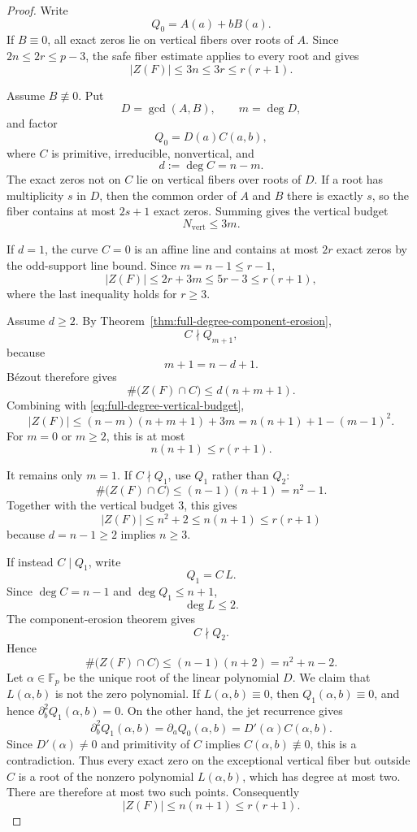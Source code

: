 \documentclass[11pt]{article}
\newcommand{\F}{\mathbb F}
\begin{document}
\begin{proof}
Write
\[
 Q_0=A(a)+bB(a).
\]
If \(B\equiv0\), all exact zeros lie on vertical fibers over roots of
\(A\).  Since \(2n\le2r\le p-3\), the safe fiber estimate applies to
every root and gives
\[
 |Z(F)|\le3n\le3r\le r(r+1).
\]

Assume \(B\not\equiv0\).  Put
\[
 D=\gcd(A,B),\qquad m=\deg D,
\]
and factor
\[
 Q_0=D(a)C(a,b),
\]
where \(C\) is primitive, irreducible, nonvertical, and
\[
 d:=\deg C=n-m.
\]
The exact zeros not on \(C\) lie on vertical fibers over roots of
\(D\).  If a root has multiplicity \(s\) in \(D\), then the common
order of \(A\) and \(B\) there is exactly \(s\), so the fiber contains
at most \(2s+1\) exact zeros.  Summing gives the vertical budget
\begin{equation}
 N_{\mathrm{vert}}\le3m.
 \label{eq:full-degree-vertical-budget}
\end{equation}

If \(d=1\), the curve \(C=0\) is an affine line and contains at most
\(2r\) exact zeros by the odd-support line bound.  Since
\(m=n-1\le r-1\),
\[
 |Z(F)|
 \le2r+3m
 \le5r-3
 \le r(r+1),
\]
where the last inequality holds for \(r\ge3\).

Assume \(d\ge2\).  By
Theorem~\ref{thm:full-degree-component-erosion},
\[
 C\nmid Q_{m+1},
\]
because
\[
 m+1=n-d+1.
\]
B\'ezout therefore gives
\[
 \#\bigl(Z(F)\cap C\bigr)
 \le
 d(n+m+1).
\]
Combining with \eqref{eq:full-degree-vertical-budget},
\[
 |Z(F)|
 \le
 (n-m)(n+m+1)+3m
 =
 n(n+1)+1-(m-1)^2.
 \label{eq:full-degree-almost}
\]
For \(m=0\) or \(m\ge2\), this is at most
\[
 n(n+1)\le r(r+1).
\]

It remains only \(m=1\).  If \(C\nmid Q_1\), use \(Q_1\) rather than
\(Q_2\):
\[
 \#\bigl(Z(F)\cap C\bigr)
 \le
 (n-1)(n+1)=n^2-1.
\]
Together with the vertical budget \(3\), this gives
\[
 |Z(F)|\le n^2+2\le n(n+1)\le r(r+1)
\]
because \(d=n-1\ge2\) implies \(n\ge3\).

If instead \(C\mid Q_1\), write
\[
 Q_1=C\,L.
\]
Since \(\deg C=n-1\) and \(\deg Q_1\le n+1\),
\[
 \deg L\le2.
\]
The component-erosion theorem gives
\[
 C\nmid Q_2.
\]
Hence
\[
 \#\bigl(Z(F)\cap C\bigr)
 \le
 (n-1)(n+2)
 =
 n^2+n-2.
\]
Let \(\alpha\in\F_p\) be the unique root of the linear polynomial
\(D\).  We claim that \(L(\alpha,b)\) is not the zero polynomial.  If
\(L(\alpha,b)\equiv0\), then \(Q_1(\alpha,b)\equiv0\), and hence
\(\partial_b^2Q_1(\alpha,b)=0\).  On the other hand, the jet recurrence gives
\[
 \partial_b^2Q_1(\alpha,b)
 =\partial_aQ_0(\alpha,b)
 =D'(\alpha)C(\alpha,b).
\]
Since \(D'(\alpha)\ne0\) and primitivity of \(C\) implies
\(C(\alpha,b)\not\equiv0\), this is a contradiction.  Thus every exact
zero on the exceptional vertical fiber but outside \(C\) is a root of the
nonzero polynomial \(L(\alpha,b)\), which has degree at most two.  There are
therefore at most two such points.  Consequently
\[
 |Z(F)|\le n(n+1)\le r(r+1).
\]
\end{proof}
\end{document}
